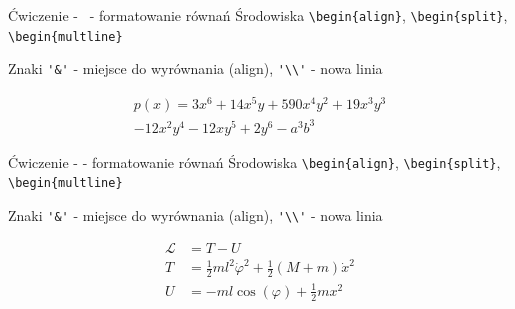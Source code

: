 \documentclass{beamer}
\theoremstyle{newblock}
\begin{document}
\begin{frame}[fragile]{Ćwiczenie - \showmycounter \ - formatowanie równań}
    Środowiska \verb|\begin{align}|, \verb|\begin{split}|, \verb|\begin{multline}|
    
    Znaki \verb|'&'| - miejsce do wyrównania (align), \verb|'\\'| - nowa linia

    \begin{examples}
        \begin{multline}
            p(x) = 3x^6 + 14x^5y + 590x^4y^2 + 19x^3y^3\\ 
            - 12x^2y^4 - 12xy^5 + 2y^6 - a^3b^3
            \label{multiline}
        \end{multline}
    \end{examples}
\end{frame}
\begin{frame}[fragile]{Ćwiczenie -  - formatowanie równań}
    Środowiska \verb|\begin{align}|, \verb|\begin{split}|, \verb|\begin{multline}|
    
    Znaki \verb|'&'| - miejsce do wyrównania (align), \verb|'\\'| - nowa linia

    \begin{examples}
        \begin{align*}
            \mathcal{L} &= T - U\\
            T &= \frac{1}{2}ml^2 \dot{\varphi} ^2 + \frac{1}{2}(M + m)\dot x^2 \\
            U &= - ml\cos (\varphi) + \frac{1}{2}mx^2\\
            \label{}
        \end{align*}
    \end{examples}
\end{frame}
\end{document}

